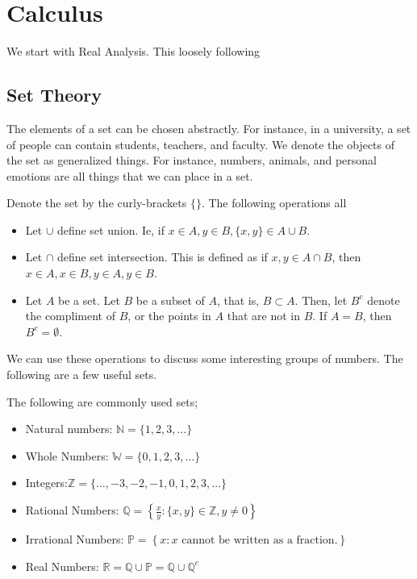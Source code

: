 \chapter{Calculus}

We start with Real Analysis. This loosely following \cite{intro2realanalysis}

\section{Set Theory}
The elements of a set can be chosen abstractly. For instance, in a university, a set of people can contain students, teachers, and faculty. We denote the objects of the set as generalized things. For instance, numbers, animals, and personal emotions are all things that we can place in a set.

Denote the set by the curly-brackets $\{\}$. The following operations all

\begin{definition}
    \begin{itemize}
        \item Let $\cup$ define set union. Ie, if $x \in A, y \in B, \{x,y\} \in A\cup B$.
        \item Let $\cap$ define set intersection. This is defined as if $x, y \in A\cap B$, then $x \in A, x\in B, y\in A, y\in B$.
        \item Let $A$ be a set. Let $B$ be a subset of $A$, that is, $B\subset A$.  Then, let $B^c$ denote the compliment of $B$, or the points in $A$ that are not in $B$. If $A = B$, then $B^c = \emptyset$.
    \end{itemize}
\end{definition}

We can use these operations to discuss some interesting groups of numbers. The following are a few useful sets.

\begin{definition}
    The following are commonly used sets;
    \begin{itemize}
        \item Natural numbers: $\mathbb{N} = \{1,2,3,\dots \}$ 
        \item Whole Numbers: $\mathbb{W} = \{0, 1,2,3,\dots \}$
        \item Integers:$\mathbb{Z} = \{\dots, -3, -2, -1, 0, 1,2,3,\dots \}$
        \item Rational Numbers: $\mathbb{Q} = \left\{\frac{x}{y} : \{x,y\} \in \mathbb{Z}, y\neq 0\right\}$
        \item Irrational Numbers: $\mathbb{P} = \left\{x : x\text{ cannot be written as a fraction.}\right\}$
        \item Real Numbers: $\mathbb{R} = \mathbb{Q}\cup \mathbb{P}=\mathbb{Q} \cup \mathbb{Q}^c$
    \end{itemize}
\end{definition}

